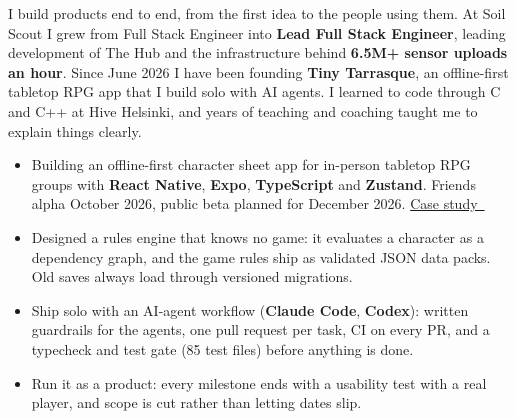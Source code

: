 \documentclass[10pt,a4paper,ragged2e,withhyper]{altacv}
\newcommand{\cvlink}[2]{\href{#1}{\color{Teal}#2~\raisebox{0.1ex}{\scriptsize$\nearrow$}}}
\begin{document}


\makecvheader

I build products end to end, from the first idea to the people using them. At Soil Scout I grew from Full Stack
Engineer into \textbf{Lead Full Stack Engineer}, leading development of The Hub and the infrastructure behind
\textbf{6.5M+ sensor uploads an hour}. Since June 2026 I have been founding \textbf{Tiny Tarrasque}, an offline-first
tabletop RPG app that I build solo with AI agents. I learned to code through C and C++ at Hive Helsinki, and years
of teaching and coaching taught me to explain things clearly.


\begin{itemize}
  \item Building an offline-first character sheet app for in-person tabletop RPG groups with \textbf{React Native},
        \textbf{Expo}, \textbf{TypeScript} and \textbf{Zustand}. Friends alpha October 2026, public beta planned for December 2026.
        \cvlink{https://www.nickvandendungen.com/projects/tiny-tarrasque}{Case study}
  \item Designed a rules engine that knows no game: it evaluates a character as a dependency graph, and the game
        rules ship as validated JSON data packs. Old saves always load through versioned migrations.
  \item Ship solo with an AI-agent workflow (\textbf{Claude Code}, \textbf{Codex}): written guardrails for the agents,
        one pull request per task, CI on every PR, and a typecheck and test gate (85 test files) before anything is done.
  \item Run it as a product: every milestone ends with a usability test with a real player, and scope is cut
        rather than letting dates slip.
\end{itemize}

\divider
\end{document}
